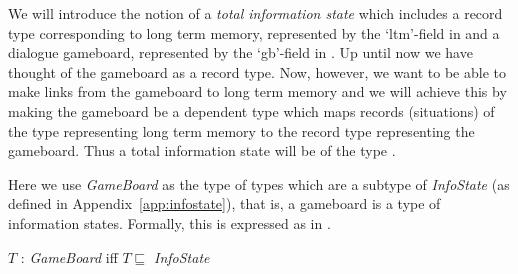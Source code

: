 We will introduce the notion of a \textit{total information state}
which includes a record type corresponding to long term memory,
represented by the `ltm'-field in \nexteg{} and a dialogue gameboard,
represented by the `gb'-field in \nexteg{}.  Up until now we have
thought of the gameboard as a record type.  Now, however, we want to
be able to make links from the gameboard to long term memory and we
will achieve this by making the gameboard be a dependent type which
maps records (situations) of the type representing long term memory to
the record type representing the gameboard.  Thus a total information state
will be of the type \nexteg{}.
\begin{ex} 
\end{ex} 
Here we use \textit{GameBoard} as the type of types which are a
subtype of \textit{InfoState} (as defined in Appendix~\ref{app:infostate}), that is, a gameboard is a type of
information states.  Formally, this is expressed as in \nexteg{}.
\begin{ex} 
$T$ : \textit{GameBoard} iff $T\sqsubseteq$ \textit{InfoState}
\label{ex:GameBoard}
\end{ex} 


